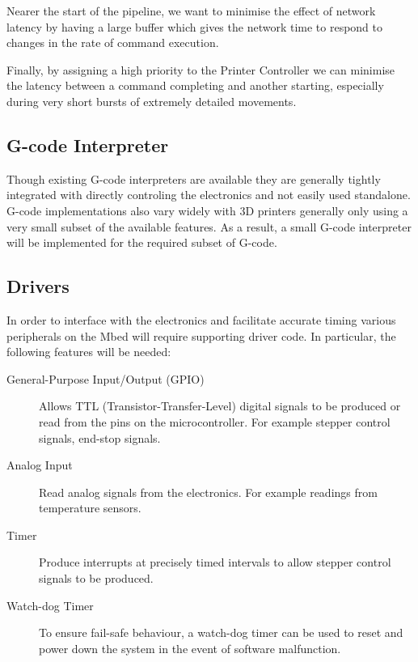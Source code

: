 			Nearer the start of the pipeline, we want to minimise the effect of
			network latency by having a large buffer which gives the network time to
			respond to changes in the rate of command execution.
			
			
			Finally, by assigning a high priority to the Printer Controller we can
			minimise the latency between a command completing and another starting,
			especially during very short bursts of extremely detailed movements.
		
		\subsection{G-code Interpreter}
			
			Though existing G-code interpreters are available they are generally
			tightly integrated with directly controling the electronics and not easily
			used standalone. G-code implementations also vary widely with 3D printers
			generally only using a very small subset of the available features. As a
			result, a small G-code interpreter will be implemented for the required
			subset of G-code.
		
		\subsection{Drivers}
			
			In order to interface with the electronics and facilitate accurate timing
			various peripherals on the Mbed will require supporting driver code. In
			particular, the following features will be needed:
			
			\begin{description}
				\item[General-Purpose Input/Output (GPIO)]
					Allows TTL (Transistor-Transfer-Level) digital signals to be produced
					or read from the pins on the microcontroller. For example stepper
					control signals, end-stop signals.
				
				\item[Analog Input]
					Read analog signals from the electronics. For example readings from
					temperature sensors.
				
				\item[Timer]
					Produce interrupts at precisely timed intervals to allow stepper
					control signals to be produced.
				
				\item[Watch-dog Timer]
					To ensure fail-safe behaviour, a watch-dog timer can be used to reset
					and power down the system in the event of software malfunction.
			\end{description}
	
